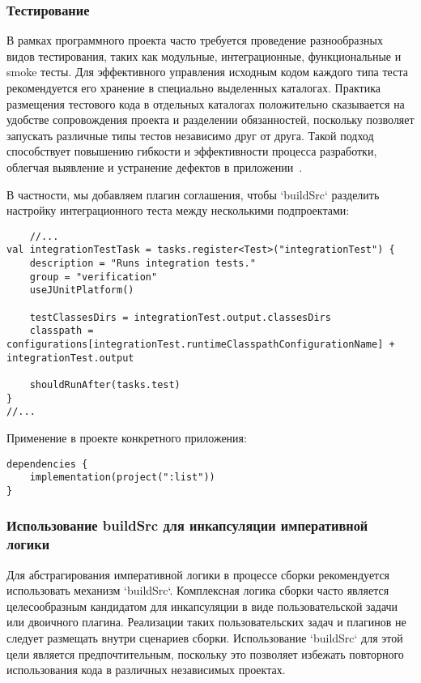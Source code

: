 
\subsubsection{Тестирование}

В рамках программного проекта часто требуется проведение разнообразных видов тестирования, таких как
модульные, интеграционные, функциональные и smoke тесты.
Для эффективного управления исходным
кодом каждого типа теста рекомендуется его хранение в специально выделенных каталогах.
Практика
размещения тестового кода в отдельных каталогах положительно сказывается на удобстве сопровождения
проекта и разделении обязанностей, поскольку позволяет запускать различные типы тестов независимо
друг от друга.
Такой подход способствует повышению гибкости и эффективности процесса разработки,
облегчая выявление и устранение дефектов в приложении~\cite{test_gradle}.

В частности, мы добавляем плагин соглашения, чтобы `buildSrc` разделить настройку интеграционного
теста между несколькими подпроектами:

\begin{lstlisting}
    //...
val integrationTestTask = tasks.register<Test>("integrationTest") {
    description = "Runs integration tests."
    group = "verification"
    useJUnitPlatform()

    testClassesDirs = integrationTest.output.classesDirs
    classpath = configurations[integrationTest.runtimeClasspathConfigurationName] + integrationTest.output

    shouldRunAfter(tasks.test)
}
//...
\end{lstlisting}


Применение в проекте конкретного приложения:

\begin{lstlisting}
dependencies {
    implementation(project(":list"))
}
\end{lstlisting}

\subsubsection{Использование buildSrc для инкапсуляции императивной логики}

Для абстрагирования императивной логики в процессе сборки рекомендуется использовать
механизм `buildSrc`.
Комплексная логика сборки часто является целесообразным кандидатом для
инкапсуляции в виде пользовательской задачи или двоичного плагина.
Реализации таких пользовательских
задач и плагинов не следует размещать внутри сценариев сборки.
Использование `buildSrc` для этой
цели является предпочтительным, поскольку это позволяет избежать повторного использования кода в
различных независимых проектах.

